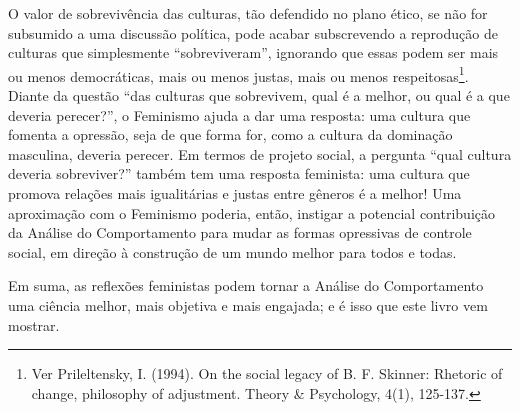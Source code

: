 O valor de sobrevivência das culturas, tão defendido no plano ético, se não for subsumido a uma discussão política, pode acabar subscrevendo a reprodução de culturas que simplesmente “sobreviveram”, ignorando que essas podem ser mais ou menos democráticas, mais ou menos justas, mais ou menos respeitosas\footnote{Ver Prileltensky, I. (1994). On the social legacy of B. F. Skinner: Rhetoric of change, philosophy of adjustment. Theory \& Psychology, 4(1), 125-137.}. Diante da questão “das culturas que sobrevivem, qual é a melhor, ou qual é a que deveria perecer?”, o Feminismo ajuda a dar uma resposta: uma cultura que fomenta a opressão, seja de que forma for, como a cultura da dominação masculina, deveria perecer. Em termos de projeto social, a pergunta ``qual cultura deveria sobreviver?'' também tem uma resposta feminista: uma cultura que promova relações mais igualitárias e justas entre gêneros é a melhor! Uma aproximação com o Feminismo poderia, então, instigar a potencial contribuição da Análise do Comportamento para mudar as formas opressivas de controle social, em direção à construção de um mundo melhor para todos e todas. 

Em suma, as reflexões feministas podem tornar a Análise do Comportamento uma ciência melhor, mais objetiva e mais engajada; e é isso que este livro vem mostrar. 